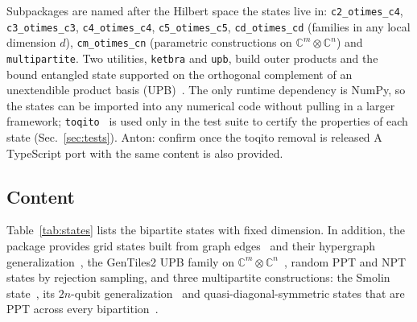 \documentclass[aps,pra,twocolumn,superscriptaddress,groupedaddress]{revtex4-2}
\newcommand{\C}{\mathds{C}}
\newcommand{\code}[1]{\texttt{#1}}
\newcommand{\anton}[1]{{\color{antongreen} Anton: #1}}
\begin{document}
Subpackages are named after the Hilbert space the states live in:
\code{c2\_otimes\_c4}, \code{c3\_otimes\_c3}, \code{c4\_otimes\_c4},
\code{c5\_otimes\_c5}, \code{cd\_otimes\_cd} (families in any local dimension
$d$), \code{cm\_otimes\_cn} (parametric constructions on $\C^m\otimes\C^n$) and
\code{multipartite}. Two utilities, \code{ketbra} and \code{upb}, build outer
products and the bound entangled state supported on the orthogonal complement
of an unextendible product basis (UPB)~\cite{Bennett1999UPB}. The only runtime
dependency is NumPy, so the states can be imported into any numerical code
without pulling in a larger framework; \code{toqito}~\cite{toqito} is used only
in the test suite to certify the properties of each state
(Sec.~\ref{sec:tests}). \anton{confirm once the toqito removal is released} A
TypeScript port with the same content is also provided.

\subsection{Content}

Table~\ref{tab:states} lists the bipartite states with fixed dimension. In
addition, the package provides grid states built from graph
edges~\cite{Lockhart2018} and their hypergraph
generalization~\cite{Krebs2024}, the GenTiles2 UPB family on
$\C^m\otimes\C^n$~\cite{DiVincenzo2003}, random PPT and NPT states by rejection
sampling, and three multipartite constructions: the Smolin
state~\cite{Smolin2001}, its $2n$-qubit generalization~\cite{Augusiak2006}
and quasi-diagonal-symmetric states that are PPT across every
bipartition~\cite{Tura2018}.
\end{document}
